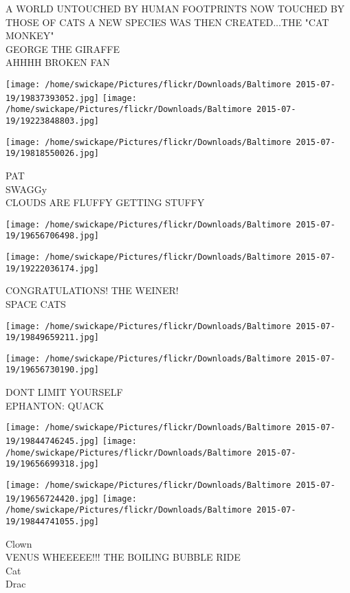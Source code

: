 \documentclass[10pt,letterpaper]{article}
\begin{document}
A WORLD UNTOUCHED BY HUMAN FOOTPRINTS NOW TOUCHED BY THOSE OF CATS A NEW SPECIES WAS THEN CREATED...THE "CAT MONKEY"\\
GEORGE THE GIRAFFE\\
AHHHH BROKEN FAN
\pagebreak

\texttt{[image: /home/swickape/Pictures/flickr/Downloads/Baltimore 2015-07-19/19837393052.jpg]}
\texttt{[image: /home/swickape/Pictures/flickr/Downloads/Baltimore 2015-07-19/19223848803.jpg]}

\vspace{0.25in}
\texttt{[image: /home/swickape/Pictures/flickr/Downloads/Baltimore 2015-07-19/19818550026.jpg]}

PAT\\
SWAGGy\\
CLOUDS ARE FLUFFY GETTING STUFFY
\pagebreak

\texttt{[image: /home/swickape/Pictures/flickr/Downloads/Baltimore 2015-07-19/19656706498.jpg]}

\vspace{0.25in}
\texttt{[image: /home/swickape/Pictures/flickr/Downloads/Baltimore 2015-07-19/19222036174.jpg]}

CONGRATULATIONS!  THE WEINER!\\
SPACE CATS
\pagebreak

\texttt{[image: /home/swickape/Pictures/flickr/Downloads/Baltimore 2015-07-19/19849659211.jpg]}

\vspace{0.25in}
\texttt{[image: /home/swickape/Pictures/flickr/Downloads/Baltimore 2015-07-19/19656730190.jpg]}

DONT LIMIT YOURSELF\\
EPHANTON: QUACK
\pagebreak

\texttt{[image: /home/swickape/Pictures/flickr/Downloads/Baltimore 2015-07-19/19844746245.jpg]}
\texttt{[image: /home/swickape/Pictures/flickr/Downloads/Baltimore 2015-07-19/19656699318.jpg]}

\texttt{[image: /home/swickape/Pictures/flickr/Downloads/Baltimore 2015-07-19/19656724420.jpg]}
\texttt{[image: /home/swickape/Pictures/flickr/Downloads/Baltimore 2015-07-19/19844741055.jpg]}

Clown\\
VENUS WHEEEEE!!! THE BOILING BUBBLE RIDE\\
Cat\\
Drac
\pagebreak
\end{document}
